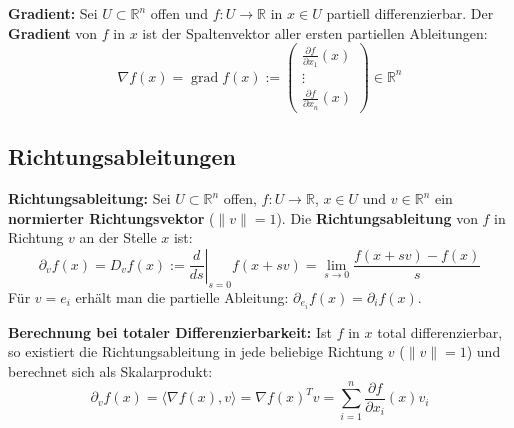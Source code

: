 \begin{definition}
    \textbf{Gradient:} Sei $U \subset \mathbb{R}^n$ offen und $f: U \to \mathbb{R}$ in $x \in U$ partiell differenzierbar. Der \textbf{Gradient} von $f$ in $x$ ist der Spaltenvektor aller ersten partiellen Ableitungen:
    $$ \nabla f(x) = \operatorname{grad} f(x) := \begin{pmatrix} \frac{\partial f}{\partial x_1}(x) \\ \vdots \\ \frac{\partial f}{\partial x_n}(x) \end{pmatrix} \in \mathbb{R}^n $$
\end{definition}

\subsection{Richtungsableitungen}

\begin{definition}
    \textbf{Richtungsableitung:} Sei $U \subset \mathbb{R}^n$ offen, $f: U \to \mathbb{R}$, $x \in U$ und $v \in \mathbb{R}^n$ ein \textbf{normierter Richtungsvektor} ($\|v\| = 1$). Die \textbf{Richtungsableitung} von $f$ in Richtung $v$ an der Stelle $x$ ist:
    $$ \partial_v f(x) = D_v f(x) := \left. \frac{d}{ds} \right|_{s=0} f(x + s v) = \lim_{s \to 0} \frac{f(x + s v) - f(x)}{s} $$
    Für $v = e_i$ erhält man die partielle Ableitung: $\partial_{e_i} f(x) = \partial_i f(x)$.
\end{definition}

\begin{theorem}
    \textbf{Berechnung bei totaler Differenzierbarkeit:} Ist $f$ in $x$ total differenzierbar, so existiert die Richtungsableitung in jede beliebige Richtung $v$ ($\|v\|=1$) und berechnet sich als Skalarprodukt:
    $$ \partial_v f(x) = \langle \nabla f(x), v \rangle = \nabla f(x)^T v = \sum_{i=1}^n \frac{\partial f}{\partial x_i}(x) v_i $$
\end{theorem}

